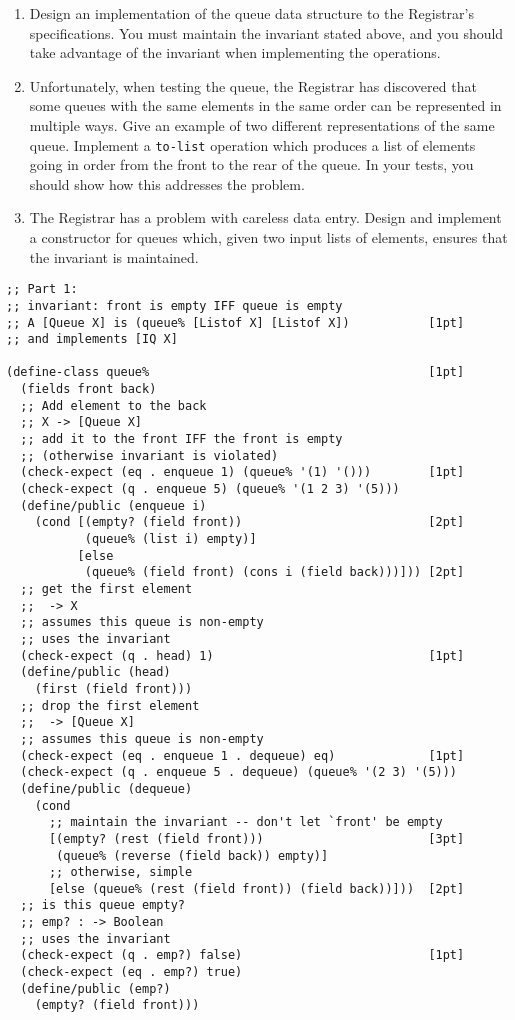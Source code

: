 \documentclass[12pt]{article}                   %
\newenvironment{solution}{}{}
\newcommand\code[1]{\texttt{#1}}
\begin{document}
\begin{problem}
\begin{enumerate}
\item Design an implementation of the queue data structure to the Registrar's
  specifications.  You must maintain the invariant stated above, and
  you should take advantage of the invariant when implementing the
  operations.
\item Unfortunately, when testing the queue, the Registrar has
  discovered that some queues with the same elements in the same order
  can be represented in multiple ways.  Give an example of two
  different representations of the same queue.  Implement a
  \code{to-list} operation which produces a list of elements going in
  order from the front to the rear of the queue. In your tests, you
  should show how this addresses the problem.
\item The Registrar has a problem with careless data entry.  Design
  and implement a constructor for queues which, given two input lists
  of elements, ensures that the invariant is maintained.  
\end{enumerate}

\begin{solution}
\begin{verbatim}
;; Part 1:
;; invariant: front is empty IFF queue is empty
;; A [Queue X] is (queue% [Listof X] [Listof X])           [1pt]
;; and implements [IQ X]

(define-class queue%                                       [1pt]
  (fields front back)
  ;; Add element to the back
  ;; X -> [Queue X]
  ;; add it to the front IFF the front is empty
  ;; (otherwise invariant is violated)
  (check-expect (eq . enqueue 1) (queue% '(1) '()))        [1pt]
  (check-expect (q . enqueue 5) (queue% '(1 2 3) '(5)))
  (define/public (enqueue i)
    (cond [(empty? (field front))                          [2pt]
           (queue% (list i) empty)]
          [else
           (queue% (field front) (cons i (field back)))])) [2pt]
  ;; get the first element
  ;;  -> X
  ;; assumes this queue is non-empty
  ;; uses the invariant
  (check-expect (q . head) 1)                              [1pt]
  (define/public (head)                                    
    (first (field front)))
  ;; drop the first element
  ;;  -> [Queue X]
  ;; assumes this queue is non-empty
  (check-expect (eq . enqueue 1 . dequeue) eq)             [1pt]
  (check-expect (q . enqueue 5 . dequeue) (queue% '(2 3) '(5)))
  (define/public (dequeue)
    (cond 
      ;; maintain the invariant -- don't let `front' be empty
      [(empty? (rest (field front)))                       [3pt]
       (queue% (reverse (field back)) empty)]
      ;; otherwise, simple
      [else (queue% (rest (field front)) (field back))]))  [2pt]
  ;; is this queue empty?
  ;; emp? : -> Boolean
  ;; uses the invariant
  (check-expect (q . emp?) false)                          [1pt]
  (check-expect (eq . emp?) true)
  (define/public (emp?)
    (empty? (field front)))


\end{verbatim}
\end{solution}
\end{problem}
\end{document}

